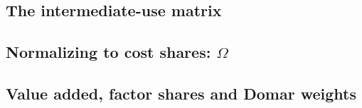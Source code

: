 \subsection{The intermediate-use matrix}\label{app:pipeline-z}

\subsection{Normalizing to cost shares: $\Omega$}\label{app:pipeline-omega}

\subsection{Value added, factor shares and Domar weights}\label{app:pipeline-va}

